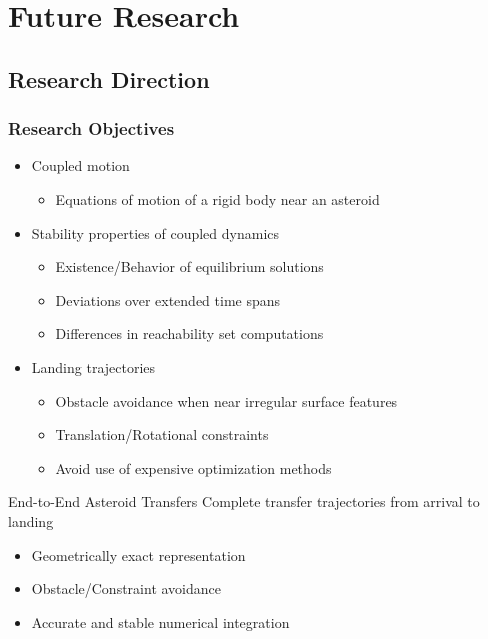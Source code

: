 \section*{Future Research}
\subsection*{Research Direction}

\begin{frame}[t]\frametitle{Research Objectives}

    \begin{itemize}
        \item Coupled motion
        \begin{itemize}
            \item Equations of motion of a rigid body near an asteroid
        \end{itemize}
        \item Stability properties of coupled dynamics
        \begin{itemize}
            \item Existence/Behavior of equilibrium solutions
            \item Deviations over extended time spans
            \item Differences in reachability set computations
        \end{itemize}
        \item Landing trajectories
        \begin{itemize}
            \item Obstacle avoidance when near irregular surface features
            \item Translation/Rotational constraints
            \item Avoid use of expensive optimization methods
        \end{itemize}
    \end{itemize}
    \pause
    \begin{block}{End-to-End Asteroid Transfers}
        Complete transfer trajectories from arrival to landing
        \begin{itemize}
            \item Geometrically exact representation
            \item Obstacle/Constraint avoidance
            \item Accurate and stable numerical integration
        \end{itemize}
    \end{block}
\end{frame}